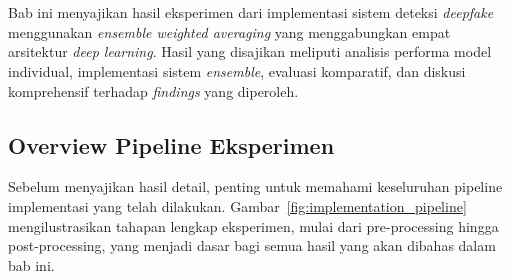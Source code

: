 \chapter{\babEmpat}

Bab ini menyajikan hasil eksperimen dari implementasi sistem deteksi \textit{deepfake} menggunakan \textit{ensemble weighted averaging} yang menggabungkan empat arsitektur \textit{deep learning}. Hasil yang disajikan meliputi analisis performa model individual, implementasi sistem \textit{ensemble}, evaluasi komparatif, dan diskusi komprehensif terhadap \textit{findings} yang diperoleh.

\section{Overview Pipeline Eksperimen}

Sebelum menyajikan hasil detail, penting untuk memahami keseluruhan pipeline implementasi yang telah dilakukan. Gambar~\ref{fig:implementation_pipeline} mengilustrasikan tahapan lengkap eksperimen, mulai dari pre-processing hingga post-processing, yang menjadi dasar bagi semua hasil yang akan dibahas dalam bab ini.

